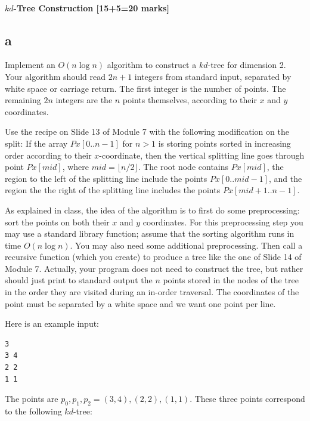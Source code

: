 \documentclass[12pt]{article}
\begin{document}
\subsection{$kd$-Tree Construction [15+5=20 marks]}
\begin{enumerate}
\part{a} Implement an $O(n\log n)$ algorithm to construct a $kd$-tree
for dimension 2.  Your algorithm should read $2n+1$ integers from
standard input, separated by white space or carriage return.  The first integer is the
number of points.  The remaining $2n$ integers are the $n$ points
themselves, according to their $x$ and $y$ coordinates.

Use the recipe on Slide 13 of Module 7 with the following modification on the split:
If the array $Px[0..n-1]$ for $n>1$ is storing points
sorted in increasing order according to their $x$-coordinate, then
the vertical splitting line goes through point $Px[mid]$, where
$mid = \lfloor n/2\rfloor$.  The root node contains $Px[mid]$, the
region to the left of the splitting
line include the points $Px[0..mid-1]$, and the region the the
right of the splitting line includes the points $Px[mid+1..n-1]$.

As explained in class, the idea of the algorithm is to first do some
preprocessing: sort the points on both their $x$ and $y$ coordinates.
For this preprocessing step you may use a standard library function;
assume that the sorting algorithm runs in time $O(n\log n)$. You may
also need some additional preprocessing.  Then call a recursive function
(which you create) to produce a tree like the one of Slide 14 of Module 7.
Actually, your program does not need to construct the tree, but rather
should just print to standard output the $n$ points stored in the nodes
of the tree in the order they are visited during an in-order traversal.
The coordinates of the point must be separated by a white space and we want 
one point per line.

Here is an example input:
\begin{verbatim}
3
3 4
2 2
1 1
\end{verbatim}
The points are $p_0,p_1,p_2 = (3,4),(2,2),(1,1)$. These three
points correspond to the following $kd$-tree:

\hfill 
{}
\hfill \resizebox{30mm}{!}{}
\hfill \phantom{a}


\end{enumerate}
\end{document}
